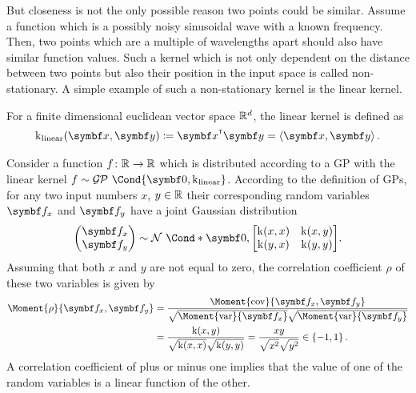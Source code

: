 But closeness is not the only possible reason two points could be similar.
Assume a function which is a possibly noisy sinusoidal wave with a known frequency.
Then, two points which are a multiple of wavelengths apart should also have similar function values.
Such a kernel which is not only dependent on the distance between two points but also their position in the input space is called non-stationary.
A simple example of such a non-stationary kernel is the linear kernel.
\begin{definition}
    For a finite dimensional euclidean vector space $\mathbb{R}^d$, the linear kernel is defined as
    \begin{align}
        \K_{\text{linear}}(\mat{x}, \mat{y}) \coloneqq \mat{x}\tran \mat{y} = \left\langle \mat{x}, \mat{y}\right\rangle.
    \end{align}
\end{definition}
Consider a function $f \colon \mathbb{R} \to \mathbb{R}$ which is distributed according to a GP with the linear kernel $f \sim \GP\Cond{\mat{0}, \K_{\text{linear}}}$.
According to the definition of GPs, for any two input numbers $x$, $y \in \mathbb{R}$ their corresponding random variables $\rv{f}_x$ and $\rv{f}_y$ have a joint Gaussian distribution
\begin{align}
    \begin{pmatrix}
        \rv{f}_x \\ \rv{f}_y
    \end{pmatrix} \sim \Gaussian*{\mat{0}, \begin{bmatrix}
            \K(x, x) & \K(x, y) \\
            \K(y, x) & \K(y, y)
        \end{bmatrix}}.
\end{align}
Assuming that both $x$ and $y$ are not equal to zero, the correlation coefficient $\rho$ of these two variables is given by
\begin{align}
    \begin{split}
        \Moment{\rho}{\rv{f}_x, \rv{f}_y} &= \frac{\Moment{\cov}{\rv{f}_x, \rv{f}_y}}{\sqrt{\Moment{\var}{\rv{f}_x\vphantom{\rv{f}_y}}}\sqrt{\Moment{\var}{\rv{f}_y}}} \\
        &= \frac{\K(x, y)}{\sqrt{\K(x, x)} \sqrt{\K(y, y)}} = \frac{xy}{\sqrt{\vphantom{y^2}x^2}\sqrt{\vphantom{y^2}y^2}} \in \left\{ -1, 1 \right\}.
    \end{split}
\end{align}
A correlation coefficient of plus or minus one implies that the value of one of the random variables is a linear function of the other.
